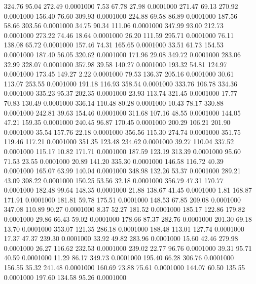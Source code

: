  324.76   95.04  272.49   0.0001000
   7.53   67.78   27.98   0.0001000
 271.47   69.13  270.92   0.0001000
 156.40   76.60  309.93   0.0001000
 224.88   69.58   86.89   0.0001000
 187.56   58.66  303.56   0.0001000
  34.75   90.34  111.06   0.0001000
 347.99   93.00  212.73   0.0001000
 273.22   74.46   18.64   0.0001000
  26.20  111.59  295.71   0.0001000
  76.11  138.08   65.72   0.0001000
 157.46   74.31  165.65   0.0001000
  33.51   61.73  154.53   0.0001000
 187.40   56.05  320.62   0.0001000
 171.96   29.08  349.72   0.0001000
 283.06   32.99  328.07   0.0001000
 357.98   39.58  140.27   0.0001000
 193.32   54.81  124.97   0.0001000
 173.45  149.27    2.22   0.0001000
  79.53  136.37  205.16   0.0001000
  30.61  113.07  253.55   0.0001000
 191.18  116.93  358.54   0.0001000
 333.76  106.78  334.36   0.0001000
 335.23   95.37  202.35   0.0001000
  23.93  113.74  321.45   0.0001000
  17.77   70.83  130.49   0.0001000
 336.14  110.48   80.28   0.0001000
  10.43   78.17  330.88   0.0001000
 242.81   39.63  154.46   0.0001000
 311.68  107.16   48.55   0.0001000
 144.05   47.21  159.35   0.0001000
 240.45   96.87  170.45   0.0001000
 200.29  106.21  201.90   0.0001000
  35.54  157.76   22.18   0.0001000
 356.56  115.30  274.74   0.0001000
 351.75  119.46  117.21   0.0001000
 351.35  123.48  234.62   0.0001000
  39.27  110.04  337.52   0.0001000
 115.17   10.82  171.71   0.0001000
 187.59  123.19  313.39   0.0001000
  95.60   71.53   23.55   0.0001000
  20.89  141.20  335.30   0.0001000
 146.58  116.72   40.39   0.0001000
 165.07   63.99  140.04   0.0001000
 348.98  132.26   53.37   0.0001000
 289.21   43.09  308.22   0.0001000
 150.25   53.56   32.18   0.0001000
 356.79   47.31  170.77   0.0001000
 182.48   99.64  148.35   0.0001000
  21.88  138.67   41.45   0.0001000
   1.81  168.87  171.91   0.0001000
 181.81   59.78  175.51   0.0001000
 148.53   67.85  209.08   0.0001000
 347.08  110.89   90.27   0.0001000
   8.37   52.27  181.52   0.0001000
 185.17  122.86  179.82   0.0001000
  29.86   66.43   59.02   0.0001000
 178.66   87.37  282.76   0.0001000
 201.30   69.18   13.70   0.0001000
 353.07  121.35  286.18   0.0001000
 188.48  113.01  127.74   0.0001000
  17.37   47.37  239.30   0.0001000
  33.92   49.82  283.96   0.0001000
  15.60   42.46  279.98   0.0001000
  26.27  116.62  232.53   0.0001000
 239.02   22.77   96.76   0.0001000
  39.31   95.71   40.59   0.0001000
  11.29   86.17  349.73   0.0001000
 195.40   66.28  306.76   0.0001000
 156.55   35.32  241.48   0.0001000
 160.69   73.88   75.61   0.0001000
 144.07   60.50  135.55   0.0001000
 197.60  134.58   95.26   0.0001000
